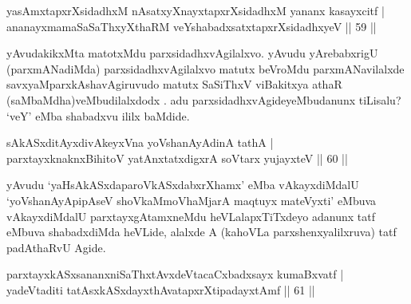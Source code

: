 
\begin{shl}
yasAmxtapxrXsidadhxM nAsatxyXnayxtapxrXsidadhxM yananx kasayxcitf |\\
ananayxmamaSaSaThxyXthaRM veYshabadxsatxtapxrXsidadhxyeV \hfill || 59 ||
\end{shl}

\begin{artha}
yAvudakikxMta matotxMdu parxsidadhxvAgilalxvo. yAvudu yArebabxrigU  (parxmANadiMda) parxsidadhxvAgilalxvo matutx beVroMdu parxmANavilalxde savxyaMparxkAshavAgiruvudo matutx SaSiThxV viBakitxya athaR (saMbaMdha)veMbudilalxdodx . adu parxsidadhxvAgideyeMbudanunx tiLisalu? `veY' eMba shabadxvu ililx baMdide.
\end{artha}


\begin{shl}
sAkASxditAyxdivAkeyxVna yoV\s shanAyAdinA tathA |\\
parxtayxknaknxBihitoV yatAnxtatxdigxrA soV\s tarx yujayxteV \hfill || 60 ||
\end{shl}

\begin{artha}
yAvudu `yaHsAkASxdaparoVkASxdabxrXhamx' eMba vAkayxdiMdalU `yoV\s shanAyApipAseV shoVkaMmoVhaMjarA maqtuyx mateVyxti' eMbuva vAkayxdiMdalU parxtayxgAtamxneMdu heVLalapxTiTxdeyo adanunx tatf eMbuva shabadxdiMda heVLide, alalxde A (kahoVLa parxshenxyalilxruva) tatf padAthaRvU Agide.
\end{artha}


\begin{shl}
parxtayxkASxsananxniSaThxtAvxdeVtacaCxbadxsayx kumaBxvatf |\\
\footnotemark[1]yadeVtaditi tatAsxkASxdayxthAvatapxrXtipadayxtAmf \hfill || 61 ||
\end{shl}

